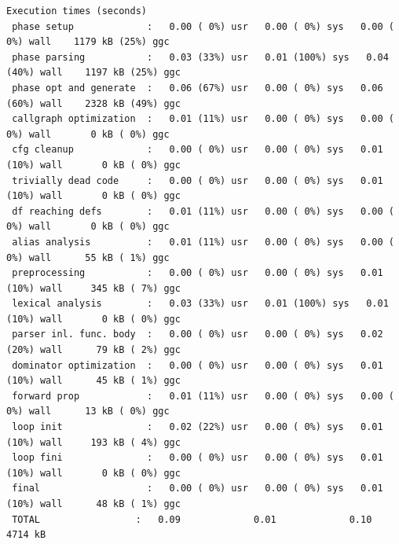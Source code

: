 \documentclass{book}
\begin{document}
\begin{scriptsize}
\begin{verbatim}
Execution times (seconds)
 phase setup             :   0.00 ( 0%) usr   0.00 ( 0%) sys   0.00 ( 0%) wall    1179 kB (25%) ggc
 phase parsing           :   0.03 (33%) usr   0.01 (100%) sys   0.04 (40%) wall    1197 kB (25%) ggc
 phase opt and generate  :   0.06 (67%) usr   0.00 ( 0%) sys   0.06 (60%) wall    2328 kB (49%) ggc
 callgraph optimization  :   0.01 (11%) usr   0.00 ( 0%) sys   0.00 ( 0%) wall       0 kB ( 0%) ggc
 cfg cleanup             :   0.00 ( 0%) usr   0.00 ( 0%) sys   0.01 (10%) wall       0 kB ( 0%) ggc
 trivially dead code     :   0.00 ( 0%) usr   0.00 ( 0%) sys   0.01 (10%) wall       0 kB ( 0%) ggc
 df reaching defs        :   0.01 (11%) usr   0.00 ( 0%) sys   0.00 ( 0%) wall       0 kB ( 0%) ggc
 alias analysis          :   0.01 (11%) usr   0.00 ( 0%) sys   0.00 ( 0%) wall      55 kB ( 1%) ggc
 preprocessing           :   0.00 ( 0%) usr   0.00 ( 0%) sys   0.01 (10%) wall     345 kB ( 7%) ggc
 lexical analysis        :   0.03 (33%) usr   0.01 (100%) sys   0.01 (10%) wall       0 kB ( 0%) ggc
 parser inl. func. body  :   0.00 ( 0%) usr   0.00 ( 0%) sys   0.02 (20%) wall      79 kB ( 2%) ggc
 dominator optimization  :   0.00 ( 0%) usr   0.00 ( 0%) sys   0.01 (10%) wall      45 kB ( 1%) ggc
 forward prop            :   0.01 (11%) usr   0.00 ( 0%) sys   0.00 ( 0%) wall      13 kB ( 0%) ggc
 loop init               :   0.02 (22%) usr   0.00 ( 0%) sys   0.01 (10%) wall     193 kB ( 4%) ggc
 loop fini               :   0.00 ( 0%) usr   0.00 ( 0%) sys   0.01 (10%) wall       0 kB ( 0%) ggc
 final                   :   0.00 ( 0%) usr   0.00 ( 0%) sys   0.01 (10%) wall      48 kB ( 1%) ggc
 TOTAL                 :   0.09             0.01             0.10               4714 kB
\end{verbatim}
\end{scriptsize}
\end{document}

